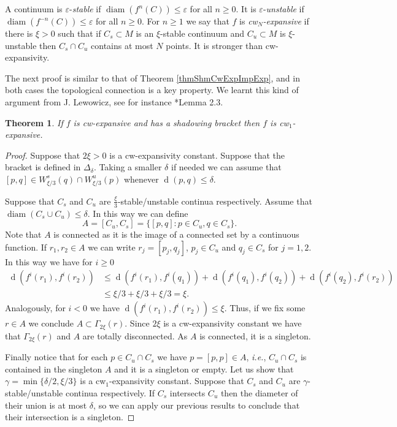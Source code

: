 \documentclass[12pt]{amsart}
\theoremstyle{plain}
\newtheorem{thm}{Theorem}[section]
\theoremstyle{definition}
\theoremstyle{remark}
\DeclareMathOperator{\diam}{diam}
\DeclareMathOperator{\dist}{d}
\DeclareMathOperator{\con}{con}
\DeclareMathOperator{\shm}{Sh}
\renewcommand{\epsilon}{\varepsilon}
\newcommand{\expc}{\xi}
\newcommand{\tM}{\tilde{M}}
\begin{document}
A continuum is $\epsilon$-\textit{stable} if $\diam(f^n(C))\leq\epsilon$ for all
$n\geq 0$. It is $\epsilon$-\textit{unstable} if $\diam(f^{-n}(C))\leq\epsilon$ for all $n\geq 0$.
For $n\geq 1$ we say that $f$ is \textit{cw$_N$-expansive} \cite{ArDend} if there is $\expc>0$ such that if
$C_s\subset M$ is an $\expc$-stable continuum and
$C_u\subset M$ is $\expc$-unstable then $C_s\cap C_u$ contains at most $N$ points.
It is stronger than cw-expansivity.

The next proof is similar to that of Theorem \ref{thmShmCwExpImpExp}, and in both cases the topological connection is a key property. We learnt this kind of argument from J. Lewowicz, see for instance \cite{Lew89}*{Lemma 2.3}.

\begin{thm}
	\label{thmcwexpshbraImpcw1exp}
	If $f$ is cw-expansive and has a shadowing bracket then $f$ is cw$_1$-expansive.
\end{thm}

\begin{proof}
	Suppose that $2\expc>0$ is a cw-expansivity constant.
	Suppose that the bracket is defined in $\Delta_\delta$.
	Taking a smaller $\delta$ if needed we can assume that
	$[p,q]\in W^s_{\expc/3}(q)\cap W^u_{\expc/3}(p)$ whenever $\dist(p,q)\leq \delta$.


	Suppose that $C_s$ and $C_u$ are $\frac{\expc}{3}$-stable/unstable continua respectively.
	Assume that $\diam(C_s\cup C_u)\leq\delta$.
	In this way we can define
	\[
	A=[C_u,C_s]=\{[p,q]:p\in C_u, q\in C_s\}.
	\]
	Note that $A$ is connected as it is the image of a connected set by a continuous function.
	If $r_1,r_2\in A$ we can write
	$r_j=[p_j,q_j]$, $p_j\in C_u$ and $q_j\in C_s$ for $j=1,2$.
	In this way we have for $i\geq 0$
	\[
	\begin{array}{rl}
		\dist(f^i(r_1),f^i(r_2))& \leq
		\dist(f^i(r_1),f^i(q_1))+
		\dist(f^i(q_1),f^i(q_2))+
		\dist(f^i(q_2),f^i(r_2))\\
		&\leq \expc/3+\expc/3+\expc/3=\expc.
	\end{array}
	\]
	Analogously, for $i<0$ we have $\dist(f^i(r_1),f^i(r_2))\leq\expc$.
	Thus, if we fix some $r\in A$ we conclude $A\subset\Gamma_{2\expc}(r)$.
	Since $2\expc$ is a cw-expansivity constant we have that $\Gamma_{2\expc}(r)$ and $A$ are totally disconnected. As $A$ is connected, it is a singleton.

	Finally notice that for each $p\in C_u\cap C_s$ we have $p=[p,p]\in A$, \textit{i.e.}, $C_u\cap C_s$ is contained in the singleton $A$ and it is a singleton or empty.
	Let us show that $\gamma=\min\{\delta/2,\expc/3\}$ is a cw$_1$-expansivity constant.
	Suppose that $C_s$ and $C_u$ are $\gamma$-stable/unstable continua respectively.
	If $C_s$ intersects $C_u$ then the diameter of their union is at most $\delta$, so we can apply our previous results to conclude that their intersection is a singleton.
\end{proof}
\end{document}
